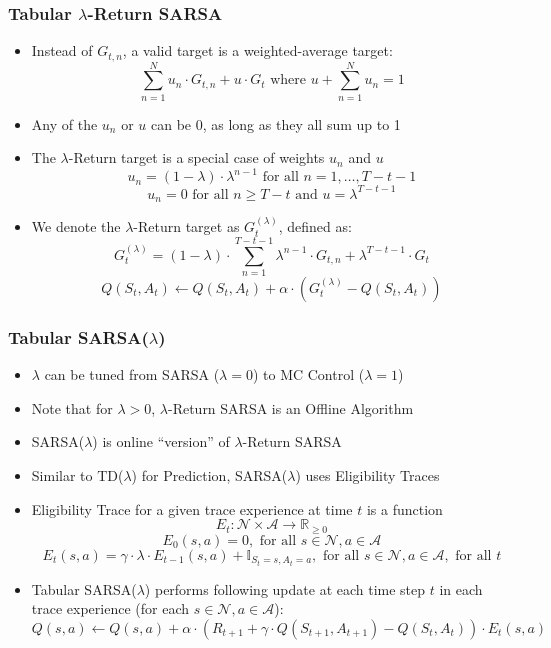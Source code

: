 \documentclass[handout]{beamer}
\begin{document}
\begin{frame}
\frametitle{Tabular $\lambda$-Return SARSA}
\pause
\begin{itemize}[<+->]
\item Instead of $G_{t,n}$, a valid target is a weighted-average target:
$$\sum_{n=1}^N u_n \cdot G_{t,n} + u \cdot G_t \text{ where } u + \sum_{n=1}^N u_n = 1$$
\item Any of the $u_n$ or $u$ can be 0, as long as they all sum up to 1
\item The $\lambda$-Return target is a special case of weights $u_n$ and $u$
$$u_n = (1 - \lambda) \cdot \lambda^{n-1} \text{ for all } n = 1, \ldots, T-t-1$$
$$u_n = 0 \text{ for all } n \geq T-t \text{ and } u = \lambda^{T-t-1}$$
\item We denote the $\lambda$-Return target as $G_t^{(\lambda)}$, defined as:
$$G_t^{(\lambda)} = (1-\lambda) \cdot \sum_{n=1}^{T-t-1} \lambda^{n-1} \cdot G_{t,n} + \lambda^{T-t-1} \cdot G_t$$
$$Q(S_t, A_t) \leftarrow Q(S_t, A_t) + \alpha \cdot (G_t^{(\lambda)} - Q(S_t, A_t))$$
\end{itemize}
\end{frame}

\begin{frame}
\frametitle{Tabular SARSA($\lambda$)}
\pause
\begin{itemize}[<+->]
\item $\lambda$ can be tuned from SARSA ($\lambda=0$) to MC Control ($\lambda=1$)
\item Note that for $\lambda > 0$, $\lambda$-Return SARSA is an Offline Algorithm
\item SARSA($\lambda$) is online ``version'' of $\lambda$-Return SARSA
\item Similar to TD($\lambda$) for Prediction, SARSA($\lambda$) uses Eligibility Traces
 \item Eligibility Trace for a given trace experience at time $t$ is a function
$$E_t: \mathcal{N} \times \mathcal{A} \rightarrow \mathbb{R}_{\geq 0}$$
$$E_0(s, a) = 0, \text{ for all } s \in \mathcal{N}, a \in \mathcal{A}$$
$$E_t(s, a) = \gamma \cdot \lambda \cdot E_{t-1}(s, a) + \mathbb{I}_{S_t=s, A_t=a}, \text{ for all } s \in \mathcal{N}, a \in \mathcal{A}, \text{ for all } t$$
\item Tabular SARSA($\lambda$) performs following update at each time step $t$ in each trace experience (for each $s \in \mathcal{N}, a \in \mathcal{A}$):
$$Q(s, a) \leftarrow Q(s, a) + \alpha \cdot (R_{t+1} + \gamma \cdot Q(S_{t+1}, A_{t+1}) - Q(S_t, A_t)) \cdot E_t(s, a)$$
\end{itemize}
\end{frame}
\end{document}
